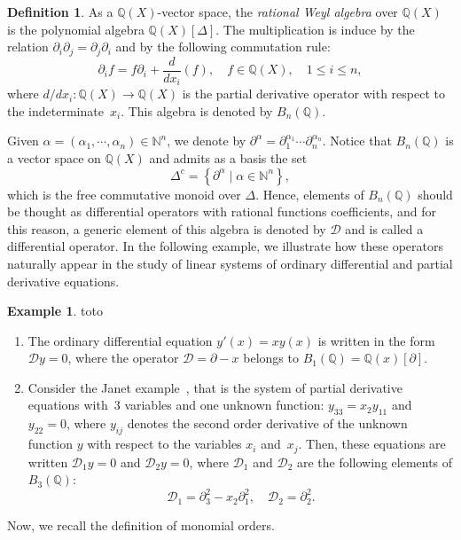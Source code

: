 \documentclass[10pt]{easychair}
\theoremstyle{definition}
\newtheorem{definition}[theorem]{Definition}
\newtheorem{example}[theorem]{Example}
\newcommand\diff[1]{\partial_{#1}}
\newcommand\D{\mathcal{D}}
\newcommand\Q{\mathbb{Q}}
\newcommand\N{\mathbb{N}}
\newcommand\Weyl[1]{B_{#1}(\Q)}
\begin{document}
\begin{definition}
  As a $\Q(X)$-vector space, the {\it rational Weyl algebra} over $\Q(X)$
  is the polynomial algebra $\Q(X)[\Delta]$. The multiplication is induce
  by the relation $\partial_i \partial_j = \partial_j \partial_i$ and by
  the following commutation rule:
  \[\diff{i}f=f\diff{i}+\frac{d}{dx_i}(f),\quad f\in\Q(X),\quad
  1\leq i\leq n,\]
  where $d/dx_i:\Q(X)\to\Q(X)$ is the partial derivative operator with
  respect to the indeterminate~$x_i$. This algebra is denoted by
  $\Weyl{n}$.
\end{definition}
\smallskip

Given $\alpha=(\alpha_1,\cdots,\alpha_n)\in\N^n$, we denote by 
$\partial^{\alpha}=\diff{1}^{\alpha_1}\cdots\diff{n}^{\alpha_n}$. Notice
that $\Weyl{n}$ is a vector space on $\Q(X)$ and admits as a basis the
set
\[\Delta^c=\left\{\partial^\alpha\mid\alpha\in\N^n\right\},\]
which is the free commutative monoid over $\Delta$. Hence, elements of
$\Weyl{n}$ should be thought as differential operators with rational
functions coefficients, and for this reason, a generic element of this
algebra is denoted by $\D$ and is called a differential operator. In the
following example, we illustrate how these operators naturally appear in
the study of linear systems of ordinary differential and partial
derivative equations.
\smallskip

\begin{example}\label{ex:diff_operators_init}
  {\color{white}toto}
  \begin{enumerate}
  \item The ordinary differential equation $y'(x)=xy(x)$ is written in
    the form $\D y=0$, where the operator $\D=\partial-x$ belongs to
    $\Weyl{1}=\Q(x)[\partial]$.
  \item Consider the Janet example~\cite{MR3532888}, that is the system
    of partial derivative equations with~$3$ variables and one unknown
    function: $y_{33}=x_2y_{11}$ and $y_{22}=0$, where $y_{ij}$ denotes
    the second order derivative of the unknown function $y$ with respect
    to the variables $x_i$ and~$x_j$. Then, these equations are written
    $\D_1y=0$ and $\D_2y=0$, where $\D_1$ and $\D_2$ are the following
    elements of $\Weyl{3}$:
    \[\D_1=\partial_3^2-x_2\partial_1^2,\quad \D_2=\partial_2^2.\]
  \end{enumerate}
\end{example}
\smallskip

Now, we recall the definition of monomial orders.
\smallskip
\end{document}
